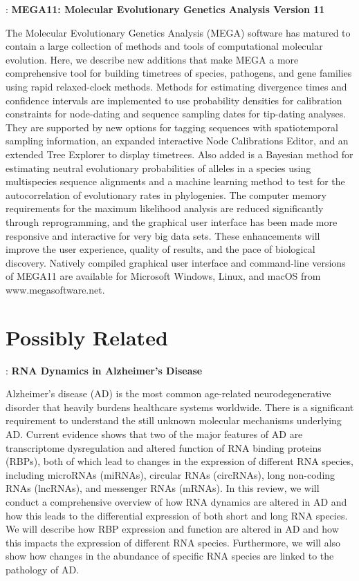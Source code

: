\documentclass[11pt]{article}
\begin{document}
\cite{tamura2021mega11}: \textbf{MEGA11: Molecular Evolutionary Genetics Analysis Version 11}

The Molecular Evolutionary Genetics Analysis (MEGA) software has matured to contain a large collection of methods and tools of computational molecular evolution. 
Here, we describe new additions that make MEGA a more comprehensive tool for building timetrees of species, pathogens, and gene families using rapid relaxed-clock methods. 
Methods for estimating divergence times and confidence intervals are implemented to use probability densities for calibration constraints for node-dating and sequence sampling dates for tip-dating analyses. 
They are supported by new options for tagging sequences with spatiotemporal sampling information, an expanded interactive Node Calibrations Editor, and an extended Tree Explorer to display timetrees. 
Also added is a Bayesian method for estimating neutral evolutionary probabilities of alleles in a species using multispecies sequence alignments and a machine learning method to test for the autocorrelation of evolutionary rates in phylogenies. 
The computer memory requirements for the maximum likelihood analysis are reduced significantly through reprogramming, and the graphical user interface has been made more responsive and interactive for very big data sets. 
These enhancements will improve the user experience, quality of results, and the pace of biological discovery. 
Natively compiled graphical user interface and command-line versions of MEGA11 are available for Microsoft Windows, Linux, and macOS from www.megasoftware.net.

\section{Possibly Related}

\cite{rybak2021rna}: \textbf{RNA Dynamics in Alzheimer’s Disease}

Alzheimer’s disease (AD) is the most common age-related neurodegenerative disorder that heavily burdens healthcare systems worldwide. 
There is a significant requirement to understand the still unknown molecular mechanisms underlying AD. 
Current evidence shows that two of the major features of AD are transcriptome dysregulation and altered function of RNA binding proteins (RBPs), both of which lead to changes in the expression of different RNA species, including microRNAs (miRNAs), circular RNAs (circRNAs), long non-coding RNAs (lncRNAs), and messenger RNAs (mRNAs). 
In this review, we will conduct a comprehensive overview of how RNA dynamics are altered in AD and how this leads to the differential expression of both short and long RNA species. 
We will describe how RBP expression and function are altered in AD and how this impacts the expression of different RNA species. 
Furthermore, we will also show how changes in the abundance of specific RNA species are linked to the pathology of AD.
\end{document}
